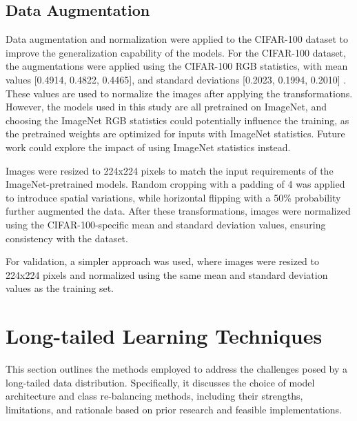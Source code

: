 


\subsection{Data Augmentation}
Data augmentation and normalization were applied to the CIFAR-100 dataset to improve the generalization capability of the models. For the CIFAR-100 dataset, the augmentations were applied using the CIFAR-100 RGB statistics, with mean values [0.4914, 0.4822, 0.4465], and standard deviations [0.2023, 0.1994, 0.2010] \cite{kaidic_ldam_drw}. These values are used to normalize the images after applying the transformations. However, the models used in this study are all pretrained on ImageNet, and choosing the ImageNet RGB statistics could potentially influence the training, as the pretrained weights are optimized for inputs with ImageNet statistics. Future work could explore the impact of using ImageNet statistics instead.

Images were resized to 224x224 pixels to match the input requirements of the ImageNet-pretrained models. Random cropping with a padding of 4 was applied to introduce spatial variations, while horizontal flipping with a 50\% probability further augmented the data. After these transformations, images were normalized using the CIFAR-100-specific mean and standard deviation values, ensuring consistency with the dataset.

For validation, a simpler approach was used, where images were resized to 224x224 pixels and normalized using the same mean and standard deviation values as the training set.

\section{Long-tailed Learning Techniques}
This section outlines the methods employed to address the challenges posed by a long-tailed data distribution. Specifically, it discusses the choice of model architecture and class re-balancing methods, including their strengths, limitations, and rationale based on prior research and feasible implementations.  

